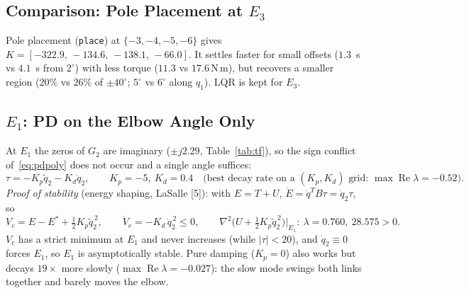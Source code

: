 \documentclass[10pt,letterpaper]{article}
\newcommand{\Nm}{\,\mathrm{N\,m}}
\newenvironment{keep}{\par\noindent\begin{minipage}{\linewidth}}{\end{minipage}\par\smallskip}
\begin{document}
\begin{keep}
\subsection{Comparison: Pole Placement at $E_3$}
Pole placement (\texttt{place}) at $\{-3,-4,-5,-6\}$ gives $K=[-322.9,\,-134.6,\,-138.1,\,-66.0]$. It settles faster for small offsets ($1.3$~s vs $4.1$~s from $2^\circ$) with less torque ($11.3$ vs $17.6\Nm$), but recovers a smaller region ($20\%$ vs $26\%$ of $\pm40^\circ$; $5^\circ$ vs $6^\circ$ along $q_1$). LQR is kept for $E_3$.
\end{keep}

\begin{keep}
\subsection{$E_1$: PD on the Elbow Angle Only}
At $E_1$ the zeros of $G_2$ are imaginary ($\pm j2.29$, Table~\ref{tab:tf}), so the sign conflict of~\eqref{eq:pdpoly} does not occur and a single angle suffices:
\begin{equation}
\tau=-K_p\tilde q_2-K_d\dot q_2,\qquad K_p=-5,\ K_d=0.4\quad\big(\text{best decay rate on a }(K_p,K_d)\text{ grid: }\max\operatorname{Re}\lambda=-0.52\big).\label{eq:e1pd}
\end{equation}
\textit{Proof of stability} (energy shaping, LaSalle [5]): with $E=T+U$, $\dot E=\dot q^TB\tau=\dot q_2\tau$, so
\begin{equation}
V_c=E-E^*+\tfrac12K_p\tilde q_2^{\,2},\qquad \dot V_c=-K_d\,\dot q_2^{\,2}\le0,\qquad
\nabla^2\!\big(U+\tfrac12K_p\tilde q_2^{\,2}\big)\big|_{E_1}:\ \lambda=0.760,\ 28.575>0 .\label{eq:vc}
\end{equation}
$V_c$ has a strict minimum at $E_1$ and never increases (while $|\tau|<20$), and $\dot q_2\equiv0$ forces $E_1$, so $E_1$ is asymptotically stable. Pure damping ($K_p=0$) also works but decays $19\times$ more slowly ($\max\operatorname{Re}\lambda=-0.027$): the slow mode swings both links together and barely moves the elbow.
\end{keep}
\end{document}
